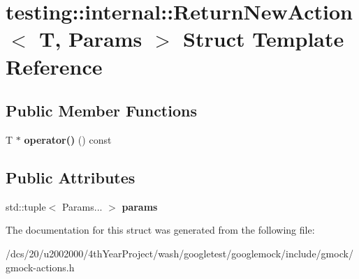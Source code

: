 \hypertarget{structtesting_1_1internal_1_1ReturnNewAction}{}\section{testing\+:\+:internal\+:\+:Return\+New\+Action$<$ T, Params $>$ Struct Template Reference}
\label{structtesting_1_1internal_1_1ReturnNewAction}
\subsection*{Public Member Functions}
\begin{DoxyCompactItemize}
\item 
\mbox{\label{structtesting_1_1internal_1_1ReturnNewAction_afc4123e37fa918c5d0c4697503949dc1}} 
T $\ast$ {\bfseries operator()} () const
\end{DoxyCompactItemize}
\subsection*{Public Attributes}
\begin{DoxyCompactItemize}
\item 
\mbox{\label{structtesting_1_1internal_1_1ReturnNewAction_a5a56f8a1df9ca8e8ae631aa7c859b469}} 
std\+::tuple$<$ Params... $>$ {\bfseries params}
\end{DoxyCompactItemize}


The documentation for this struct was generated from the following file\+:\begin{DoxyCompactItemize}
\item 
/dcs/20/u2002000/4th\+Year\+Project/wash/googletest/googlemock/include/gmock/gmock-\/actions.\+h\end{DoxyCompactItemize}
